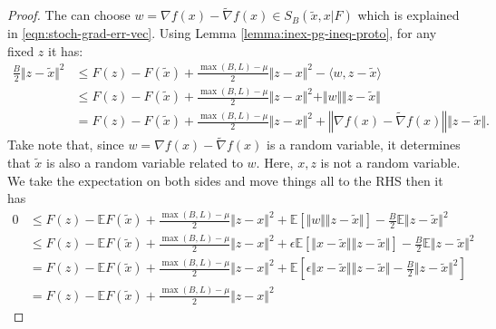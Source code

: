 \documentclass[12pt]{article}
\newcommand{\expect}{\ensuremath{\mathbb E}}
\begin{document}
        \begin{proof}
            The can choose $w = \nabla f(x) - \tilde \nabla f(x) \in S_B(\tilde x, x | F)$ which is explained in \eqref{eqn:stoch-grad-err-vec}. 
            Using Lemma \ref{lemma:inex-pg-ineq-proto}, for any fixed $z$ it has: 
            \begin{align*}
                \frac{B}{2}\Vert z - \tilde x\Vert^2 &\le 
                F(z) - F(\tilde x) + \frac{\max(B, L) - \mu}{2}\Vert z - x\Vert^2 - \langle w, z - \tilde x\rangle
                \\
                &\le 
                F(z) - F(\tilde x) + \frac{\max(B, L) - \mu}{2}\Vert z - x\Vert^2 + \Vert w\Vert\Vert z - \tilde x\Vert
                \\
                &= 
                F(z) - F(\tilde x) 
                + \frac{\max(B, L) - \mu}{2}\Vert z - x\Vert^2 
                + \left\Vert \nabla f(x) - \tilde \nabla f(x)\right\Vert\Vert z - \tilde x\Vert. 
            \end{align*}
            Take note that, since $w = \nabla f(x) - \tilde \nabla f(x)$ is a random variable, it determines that $\tilde x$ is also a random variable related to $w$. 
            Here, $x, z$ is not a random variable. 
            We take the expectation on both sides and move things all to the RHS then it has 
            \begin{align*}
                0&\le 
                F(z) - \expect F(\tilde x) + \frac{\max(B, L) - \mu}{2}\Vert z - x\Vert^2 
                + \expect\left[
                    \Vert w\Vert\Vert z - \tilde x\Vert
                \right]
                - \frac{B}{2}\expect \Vert z - \tilde x\Vert^2
                \\
                &\le F(z) - \expect F(\tilde x) + \frac{\max(B, L) - \mu}{2}\Vert z - x\Vert^2 
                + \epsilon \expect \left[
                    \Vert x - \tilde x\Vert\Vert z - \tilde x\Vert
                \right]
                - \frac{B}{2}\expect \Vert z - \tilde x\Vert^2
                \\
                &= 
                F(z) - \expect F(\tilde x) + \frac{\max(B, L) - \mu}{2}\Vert z - x\Vert^2 
                + \expect\left[
                    \epsilon\Vert x - \tilde x\Vert\Vert z - \tilde x\Vert
                    - \frac{B}{2} \Vert z - \tilde x\Vert^2
                \right]
                \\
                &=
                F(z) - \expect F(\tilde x) + \frac{\max(B, L) - \mu}{2}\Vert z - x\Vert^2 

\end{align*}
\end{proof}
\end{document}

